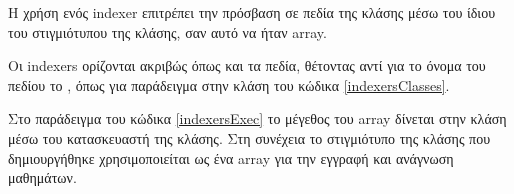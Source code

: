Η χρήση ενός indexer επιτρέπει την πρόσβαση σε πεδία της κλάσης μέσω του ίδιου του στιγμιότυπου της κλάσης, σαν αυτό να ήταν array.



Οι indexers ορίζονται ακριβώς όπως και τα πεδία, θέτοντας αντί για το όνομα του πεδίου το , όπως για παράδειγμα στην κλάση του κώδικα \ref{indexersClasses}.

Στο παράδειγμα του κώδικα \ref{indexersExec} το μέγεθος του array δίνεται στην κλάση μέσω του κατασκευαστή της κλάσης. Στη συνέχεια το στιγμιότυπο της κλάσης που δημιουργήθηκε χρησιμοποιείται ως ένα array για την εγγραφή και ανάγνωση μαθημάτων.



\newpage